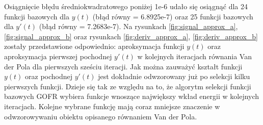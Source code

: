 Osiągnięcie błędu średniokwadratowego poniżej 1e-6 udało się osiągnąć dla 24 funkcji bazowych dla $y(t)$ (błąd równy = 6.8925e-7) oraz 25 funkcji bazowych dla $y'(t)$ (błąd równy = 7.2683e-7). Na rysunkach \ref{fig:signal_approx_a}, \ref{fig:signal_approx_b} oraz rysunkach \ref{fig:deriv_approx_a}, \ref{fig:deriv_approx_b} zostały przedstawione odpowiednio: aproksymacja funkcji $y(t)$ oraz aproksymacja pierwszej pochodnej $y'(t)$ w kolejnych iteracjach  równania Van der Pola  dla pierwszych sześciu iteracji. Jak można zauważyć kształt funkcji $y(t)$ oraz pochodnej $y'(t)$ jest dokładnie odwzorowany już po selekcji kilku pierwszych funkcji. Dzieje się tak ze względu na to, że algorytm selekcji funkcji bazowych GOFR wybiera funkcje wnoszące największy wkład energii w kolejnych iteracjach. Kolejne wybrane funkcję mają coraz mniejsze znaczenie w odwzorowywaniu obiektu opisanego równaniem Van der Pola.

